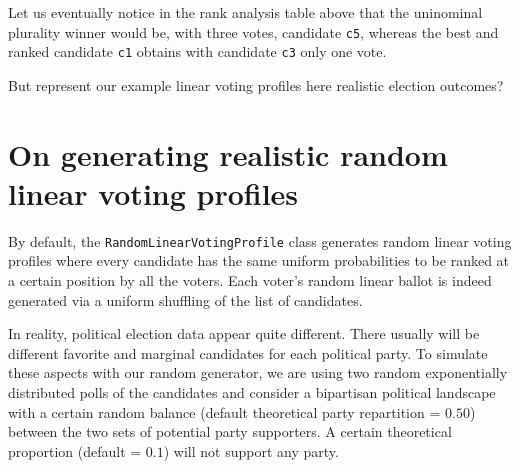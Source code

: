 Let us eventually notice in the rank analysis table above that the uninominal plurality winner would be, with three votes, candidate \texttt{c5}, whereas the best \NetFlows and \Borda ranked candidate \texttt{c1} obtains with candidate \texttt{c3} only one vote.

But represent our example linear voting profiles here realistic election outcomes?

\section{On generating realistic random linear voting profiles}
\label{sec:7.5}

By default, the \texttt{RandomLinearVotingProfile} class generates random linear voting profiles where every candidate has the same uniform probabilities to be ranked at a certain position by all the voters. Each voter's random linear ballot is indeed generated  via a uniform shuffling of the list of candidates.

In reality, political election data appear quite different. There usually will be different favorite and marginal candidates for each political party. To simulate these aspects with our random generator, we are using two random exponentially distributed polls of the candidates and consider a bipartisan political landscape with a certain random balance (default theoretical party repartition = $0.50$) between the two sets of potential party supporters. A certain theoretical proportion (default = $0.1$) will not support any party.

